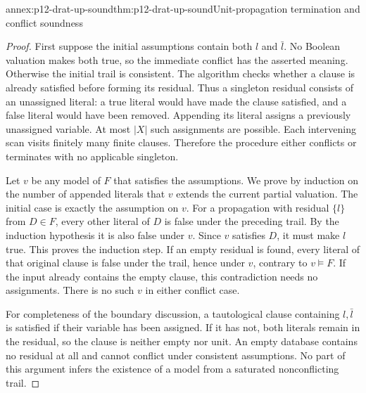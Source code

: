 
\begin{annexitem}{annex:p12-drat-up-sound}{thm:p12-drat-up-sound}{Unit-propagation termination and conflict soundness}
\begin{proof}
First suppose the initial assumptions contain both \(l\) and \(\bar l\).
No Boolean valuation makes both true, so the immediate conflict has the
asserted meaning.  Otherwise the initial trail is consistent.  The algorithm
checks whether a clause is already satisfied before forming its residual.
Thus a singleton residual consists of an unassigned literal: a true literal
would have made the clause satisfied, and a false literal would have been
removed.  Appending its literal assigns a previously unassigned variable.
At most \(\lvert X\rvert\) such assignments are possible.  Each intervening
scan visits finitely many finite clauses.  Therefore the procedure either
conflicts or terminates with no applicable singleton.

Let \(v\) be any model of \(F\) that satisfies the assumptions.  We prove
by induction on the number of appended literals that \(v\) extends the
current partial valuation.  The initial case is exactly the assumption on
\(v\).  For a propagation with residual \(\{l\}\) from \(D\in F\),
every other literal of \(D\) is false under the preceding trail.  By the
induction hypothesis it is also false under \(v\).  Since \(v\) satisfies
\(D\), it must make \(l\) true.  This proves the induction step.  If an
empty residual is found, every literal of that original clause is false under
the trail, hence under \(v\), contrary to \(v\models F\).  If the input
already contains the empty clause, this contradiction needs no assignments.
There is no such \(v\) in either conflict case.

For completeness of the boundary discussion, a tautological clause containing
\(l,\bar l\) is satisfied if their variable has been assigned.  If it has
not, both literals remain in the residual, so the clause is neither empty nor
unit.  An empty database contains no residual at all and cannot conflict
under consistent assumptions.  No part of this argument infers the existence
of a model from a saturated nonconflicting trail.
\end{proof}
\end{annexitem}

